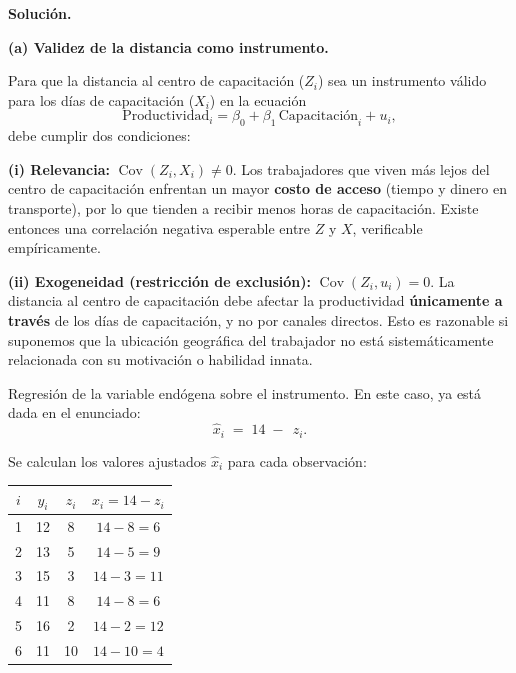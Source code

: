 \documentclass[10pt,a4paper]{article}
\begin{document}
\begin{enumerate}

\vspace{0.6cm}

\textbf{Solución.}

\vspace{0.3cm}

\noindent\textbf{(a) Validez de la distancia como instrumento.}

Para que la distancia al centro de capacitación ($Z_i$) sea un instrumento válido para los días de capacitación ($X_i$) en la ecuación
\[
\text{Productividad}_i = \beta_0 + \beta_1\,\text{Capacitación}_i + u_i,
\]
debe cumplir dos condiciones:

\vspace{0.2cm}

\noindent\textbf{(i) Relevancia:} $\operatorname{Cov}(Z_i, X_i) \neq 0$. Los trabajadores que viven más lejos del centro de capacitación enfrentan un mayor \textbf{costo de acceso} (tiempo y dinero en transporte), por lo que tienden a recibir menos horas de capacitación. Existe entonces una correlación negativa esperable entre $Z$ y $X$, verificable empíricamente.

\vspace{0.2cm}

\noindent\textbf{(ii) Exogeneidad (restricción de exclusión):} $\operatorname{Cov}(Z_i, u_i) = 0$. La distancia al centro de capacitación debe afectar la productividad \textbf{únicamente a través} de los días de capacitación, y no por canales directos. Esto es razonable si suponemos que la ubicación geográfica del trabajador no está sistemáticamente relacionada con su motivación o habilidad innata.

\vspace{0.5cm}
Regresión de la variable endógena sobre el instrumento. En este caso, ya está dada en el enunciado:
\[
\hat{x}_i \;=\; 14 \;-\; \,z_i.
\]
 
\noindent Se calculan los valores ajustados $\hat{x}_i$ para cada observación:
 
\begin{center}
\begin{tabular}{cccc}
\toprule
$i$ & $y_i$ & $z_i$ & $\hat{x}_i = 14 - z_i$ \\
\midrule
1 & 12 & 8  & $14 - 8  = 6$ \\
2 & 13 & 5  & $14 - 5  = 9$ \\
3 & 15 & 3  & $14 - 3  = 11$ \\
4 & 11 & 8  & $14 - 8  = 6$ \\
5 & 16 & 2  & $14 - 2  = 12$ \\
6 & 11 & 10 & $14 - 10 = 4$ \\
\bottomrule
\end{tabular}
\end{center}
 

\end{enumerate}
\end{document}
